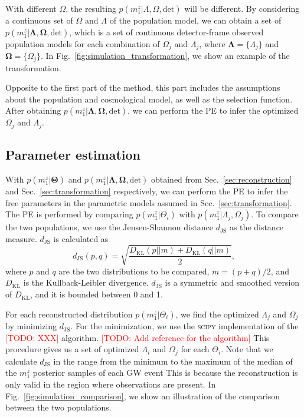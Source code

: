 \documentclass[aps,prd,twocolumn,superscriptaddress,preprintnumbers,nofootinbib,hidelinks]{revtex4-2}
\newcommand{\todo}[1]{\textcolor{red}{[TODO: #1]}}
\begin{document}
With different $\Omega$, the resulting $p(m^z_1|\Lambda, \Omega, \mathrm{det})$ will be different.
By considering a continuous set of $\Omega$ and  $\Lambda$ of the population model, we can obtain a set of $p(m^z_1|\mathbf{\Lambda}, \mathbf{\Omega}, \mathrm{det})$, which is a set of continuous detector-frame observed population models for each combination of $\Omega_j$ and $\Lambda_j$, where $\mathbf{\Lambda} = \{\Lambda_j\}$ and $\mathbf{\Omega} = \{\Omega_j\}$.
In Fig.~\ref{fig:simulation_transformation}, we show an example of the transformation.

Opposite to the first part of the method, this part includes the assumptions about the population and cosmological model, as well as the selection function.
After obtaining $p(m^z_1|\mathbf{\Lambda}, \mathbf{\Omega}, \mathrm{det})$, we can perform the \ac{PE} to infer the optimized $\Omega_j$ and $\Lambda_j$.

\subsection{Parameter estimation}
\label{sec:pe}

With $p(m^z_1|\mathbf{\Theta})$ and $p(m^z_1|\mathbf{\Lambda}, \mathbf{\Omega}, \mathrm{det})$ obtained from Sec.~\ref{sec:reconstruction} and Sec.~\ref{sec:transformation} respectively, we can perform the \ac{PE} to infer the free parameters in the parametric models assumed in Sec.~\ref{sec:transformation}.
The \ac{PE} is performed by comparing $p(m^z_1|\Theta_i)$ with $p(m^z_1|\Lambda_j, \Omega_j)$.
To compare the two populations, we use the Jensen-Shannon distance $d_\mathrm{JS}$ as the distance measure.
$d_\mathrm{JS}$ is calculated as
\begin{equation}
    d_\mathrm{JS}(p, q) = \sqrt{\frac{D_\mathrm{KL}(p||m) + D_\mathrm{KL}(q||m)}{2}},
\end{equation}
where $p$ and $q$ are the two distributions to be compared, $m = (p + q) / 2$, and $D_\mathrm{KL}$ is the Kullback-Leibler divergence.
$d_\mathrm{JS}$ is a symmetric and smoothed version of $D_\mathrm{KL}$, and it is bounded between 0 and 1.

For each reconstructed distribution $p(m^z_1|\Theta_i)$, we find the optimized $\Lambda_j$ and $\Omega_j$ by minimizing $d_\mathrm{JS}$.
For the minimization, we use the \textsc{scipy} \citep{2020SciPy-NMeth} implementation of the \todo{XXX} algorithm. \todo{Add reference for the algorithm}
This procedure gives us a set of optimized $\Lambda_i$ and $\Omega_j$ for each $\Theta_i$.
Note that we calculate $d_\mathrm{JS}$ in the range from the minimum to the maximum of the median of the $m^z_1$ posterior samples of each \ac{GW} event
This is because the reconstruction is only valid in the region where observations are present.
In Fig.~\ref{fig:simulation_comparison}, we show an illustration of the comparison between the two populations.
\end{document}
